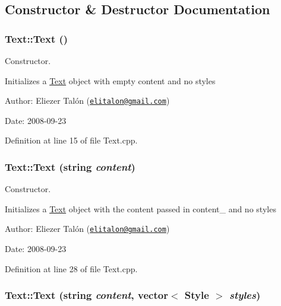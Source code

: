 \subsection{Constructor \& Destructor Documentation}
\hypertarget{class_text_b3e26143fccc52699bcc5149cae852bc}{
\subsubsection[Text]{\setlength{\rightskip}{0pt plus 5cm}Text::Text ()}}
\label{class_text_b3e26143fccc52699bcc5149cae852bc}


Constructor. 

Initializes a \hyperlink{class_text}{Text} object with empty content and no styles

\begin{Desc}
\item[Author:]Eliezer Talón (\href{mailto:elitalon@gmail.com}{\tt elitalon@gmail.com}) \end{Desc}
\begin{Desc}
\item[Date:]2008-09-23 \end{Desc}


Definition at line 15 of file Text.cpp.\hypertarget{class_text_36e53196a53aa8dc7c1de3018d8f0b6d}{
\subsubsection[Text]{\setlength{\rightskip}{0pt plus 5cm}Text::Text (string {\em content})}}
\label{class_text_36e53196a53aa8dc7c1de3018d8f0b6d}


Constructor. 

Initializes a \hyperlink{class_text}{Text} object with the content passed in content\_\- and no styles

\begin{Desc}
\item[Author:]Eliezer Talón (\href{mailto:elitalon@gmail.com}{\tt elitalon@gmail.com}) \end{Desc}
\begin{Desc}
\item[Date:]2008-09-23 \end{Desc}


Definition at line 28 of file Text.cpp.\hypertarget{class_text_1016494333aa62e305ec52f587f1cb66}{
\subsubsection[Text]{\setlength{\rightskip}{0pt plus 5cm}Text::Text (string {\em content}, \/  vector$<$ {\bf Style} $>$ {\em styles})}}
\label{class_text_1016494333aa62e305ec52f587f1cb66}


